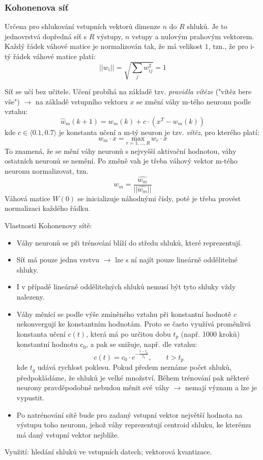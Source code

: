 \subsubsection*{Kohonenova síť}
Určena pro shlukování vstupních vektorů dimenze $ n $ do $ R $ shluků. Je to jednovrstvá dopředná síť s $ R $ výstupy, $ n $ vstupy a nulovým prahovým vektorem. Každý řádek váhové matice je normalizován tak, že má velikost $ 1 $, tzn., že pro i-tý řádek váhové matice platí:
\begin{equation}
||w_i|| = \sqrt{\displaystyle{\sum_j} w_{ij}^2} = 1
\end{equation}

Síť se učí bez učitele. Učení probíhá na základě tzv. \textit{pravidla vítěze} ("vítěz bere vše") $ \to $ na základě vstupního vektoru $ x $ se změní váhy m-tého neuronu podle vztahu:
\begin{equation}
\hat{w}_m(k+1) = w_m(k) + c \cdot (x^T - w_m(k))
\end{equation}
kde $ c \in \langle 0.1, 0.7 \rangle $ je konstanta učení a m-tý neuron je tzv. \textit{vítěz}, pro kterého platí:
\begin{equation}
w_m \cdot x = \underset{r=1,...,R}{\mathrm{max}} \, w_r \cdot x
\end{equation}
To znamená, že se mění váhy neuronů s nejvyšší aktivační hodnotou, váhy ostatních neuronů se nemění. Po změně vah je třeba váhový vektor m-tého neuronu normalizovat, tzn.
\begin{equation}
w_m = \frac{\hat{w_m}}{||\hat{w_m}||}
\end{equation}
Váhová matice $ W(0) $ se inicializuje náhodnými čísly, poté je třeba provést normalizaci každého řádku.

Vlastnosti Kohonenovy sítě:
\begin{itemize}
\item Váhy neuronů se při trénování blíží do středu shluků, které reprezentují.
\item Síť má pouze jednu vrstvu $ \to $ lze s ní najít pouze lineárně oddělitelné shluky.
\item I v případě lineárně oddělitelných shluků nemusí být tyto shluky vždy nalezeny.
\item Váhy měnící se podle výše zmíněného vztahu při konstantní hodnotě $ c $ nekonvergují ke konstantním hodnotám. Proto se často využívá proměnlivá konstanta učení $ c(t) $, která má po určitou dobu $ t_p $ (např. 1000 kroků) konstantní hodnotu $ c_0 $, a pak se snižuje, např. dle vztahu:
\begin{equation}
c(t) = c_0 \cdot e^{-\frac{t-t_p}{t_q}}, \qquad t > t_p
\end{equation}
kde $ t_q $ udává rychlost poklesu. Pokud předem neznáme počet shluků, předpokládáme, že shluků je velké množství. Během trénování pak některé neurony pravděpodobně nebudou měnit své váhy $ \to $ nemají význam a lze je vypustit.
\item Po natrénování sítě bude pro zadaný vstupní vektor největší hodnota na výstupu toho neuronu, jehož váhy reprezentují centroid shluku, ke kterému má daný vstupní vektor nejblíže.
\end{itemize}
Využití: hledání shluků ve vstupních datech; vektorová kvantizace.

